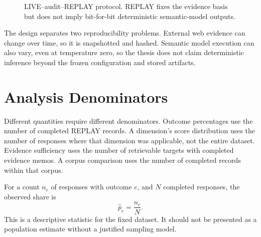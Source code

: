 \begin{figure}[ht]
\centering
{}
\caption{LIVE--audit--REPLAY protocol. REPLAY fixes the evidence basis but does not imply bit-for-bit deterministic semantic-model outputs.}
\label{fig:live-replay}
\end{figure}

The design separates two reproducibility problems. External web evidence can change over time, so it is snapshotted and hashed. Semantic model execution can also vary, even at temperature zero, so the thesis does not claim deterministic inference beyond the frozen configuration and stored artifacts.
\section{Analysis Denominators}

Different quantities require different denominators. Outcome percentages use the number of completed REPLAY records. A dimension's score distribution uses the number of responses where that dimension was applicable, not the entire dataset. Evidence sufficiency uses the number of retrievable targets with completed evidence memos. A corpus comparison uses the number of completed records within that corpus.

For a count \(n_c\) of responses with outcome \(c\), and \(N\) completed responses, the observed share is
\[
\widehat{p}_c = \frac{n_c}{N}.
\]
This is a descriptive statistic for the fixed dataset. It should not be presented as a population estimate without a justified sampling model.

